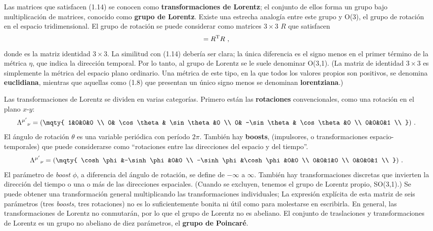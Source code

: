 \documentclass[11pt,b5paper,openany,twoside]{book}
\newcommand*{\bigone}{\text{\usefont{U}{bbold}{m}{n}1}}
\let\bigone\relax
\newcommand*{\bigone}{\text{\usefont{U}{bbold}{m}{n}1}}
\begin{document}
Las matrices que satisfacen (1.14) se conocen como {\bf transformaciones de Lorentz}; el conjunto de ellos forma un grupo bajo multiplicación de matrices, conocido como {\bf grupo de Lorentz}.
Existe una estrecha analogía entre este grupo y O(3), el grupo de rotación en el espacio tridimensional.
El grupo de rotación se puede considerar como matrices $3\times 3$ $R$ que satisfacen
\begin{equation}
\bigone = R^{\rm T} \bigone  R\ ,\label{1.16}
\end{equation}
donde \bigone es la matriz identidad $3\times 3$.
La similitud con (1.14) debería ser clara; la única diferencia es el signo menos en el primer término de la métrica $\eta$, que indica la dirección temporal.
Por lo tanto, al grupo de Lorentz se le suele denominar O(3,1). (La matriz de identidad $3\times 3$ es simplemente la métrica del espacio plano ordinario.
Una métrica de este tipo, en la que todos los valores propios son positivos, se denomina {\bf euclidiana}, mientras que aquellas como (1.8) que presentan un único signo menos se denominan {\bf lorentziana}.)

Las transformaciones de Lorentz se dividen en varias categorías.
Primero están las {\bf rotaciones} convencionales, como una rotación en el plano $x$-$y$:
\begin{equation}
\Lambda^{\mu'}{}_\nu = \left(\mqty{ 1&0&0&0 \\
0& \cos\theta & \sin\theta &0 \\  0& -\sin\theta & \cos\theta &0 \\
0&0&0&1 \\ }\right)\,.\label{1.17}
\end{equation}
El ángulo de rotación $\theta$ es una variable periódica con período $2\pi$.
También hay {\bf boosts}, (impulsores, o transformaciones espacio-temporales) que puede considerarse como ``rotaciones entre las direcciones del espacio y del tiempo''.
\begin{equation}
\Lambda^{\mu'}{}_\nu = \left(\mqty{ \cosh\phi&-\sinh\phi &0&0 \\
-\sinh\phi&\cosh\phi &0&0 \\  0&0&1&0 \\
0&0&0&1 \\ }\right)\,.\label{1.18}
\end{equation}
El parámetro de \textit{boost} $\phi$, a diferencia del ángulo de rotación, se define de $-\infty$ a $\infty$.
También hay transformaciones discretas que invierten la dirección del tiempo o una o más de las direcciones espaciales.
(Cuando se excluyen, tenemos el grupo de Lorentz propio, SO(3,1).)
Se puede obtener una transformación general multiplicando las transformaciones individuales; La expresión explícita de esta matriz de seis parámetros (tres \textit{boosts}, tres rotaciones) no es lo suficientemente bonita ni útil como para molestarse en escribirla.
En general, las transformaciones de Lorentz no conmutarán, por lo que el grupo de Lorentz no es abeliano.
El conjunto de traslaciones y transformaciones de Lorentz es un grupo no abeliano de diez parámetros, el {\bf grupo de Poincaré}.
\end{document}
